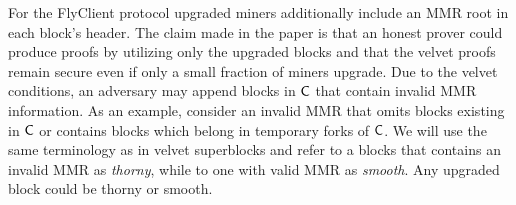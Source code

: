 %
	For the FlyClient protocol upgraded miners additionally include an MMR root in each block's header.
    The claim made in the paper is that an honest prover could produce proofs
    by utilizing only the upgraded blocks and that the velvet proofs remain secure even if only a small fraction of miners upgrade. 
    Due to the velvet conditions, an adversary may append blocks in $\mathsf{C}$ that contain invalid MMR information.
    As an example, consider an invalid MMR that omits blocks existing in $\mathsf{C}$ or contains blocks which belong in temporary forks of $\mathsf{C}$.
    We will use the same terminology as in velvet superblocks and refer to a blocks that contains an invalid MMR as \emph{thorny}, while to one with valid MMR as \emph{smooth}.
    Any upgraded block could be thorny or smooth.

